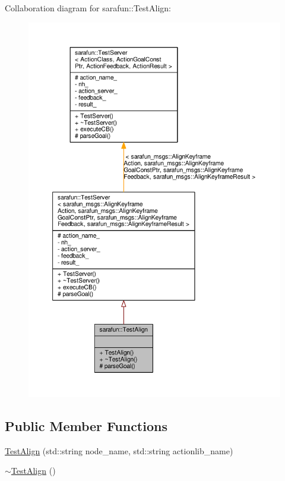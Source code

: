 Collaboration diagram for sarafun\-:\-:Test\-Align\-:\nopagebreak
\begin{figure}[H]
\begin{center}
\leavevmode
\includegraphics[width=350pt]{d0/d3f/classsarafun_1_1TestAlign__coll__graph}
\end{center}
\end{figure}
\subsection*{Public Member Functions}
\begin{DoxyCompactItemize}
\item 
\hyperlink{classsarafun_1_1TestAlign_aa2815fa88b5bd3f41ba32168d2101d58_aa2815fa88b5bd3f41ba32168d2101d58}{Test\-Align} (std\-::string node\-\_\-name, std\-::string actionlib\-\_\-name)
\item 
\hyperlink{classsarafun_1_1TestAlign_a5d171c40cea90663e8cc6e358132ad3f_a5d171c40cea90663e8cc6e358132ad3f}{$\sim$\-Test\-Align} ()
\end{DoxyCompactItemize}
